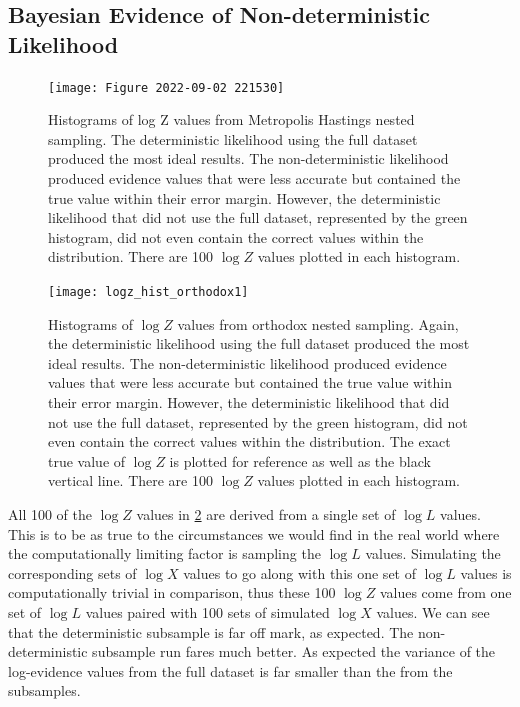 \subsection{Bayesian Evidence of Non-deterministic Likelihood}


\begin{figure} 
\centering    
\texttt{[image: Figure 2022-09-02 221530]}
\caption[Orthodox]{Histograms of log Z values from Metropolis Hastings nested sampling. The deterministic likelihood using the full dataset produced the most ideal results. The non-deterministic likelihood produced evidence values that were less accurate but contained the true value within their error margin. However, the deterministic likelihood that did not use the full dataset, represented by the green histogram, did not even contain the correct values within the distribution. There are 100 $\log Z$ values plotted in each histogram.}
\label{fig:logZ2}
\end{figure}

\begin{figure} 
\centering    
\texttt{[image: logz\_hist\_orthodox1]}
\caption{Histograms of $\log Z$ values from orthodox nested sampling. Again, the deterministic likelihood using the full dataset produced the most ideal results. The non-deterministic likelihood produced evidence values that were less accurate but contained the true value within their error margin. However, the deterministic likelihood that did not use the full dataset, represented by the green histogram, did not even contain the correct values within the distribution. The exact true value of $\log Z$ is plotted for reference as well as the black vertical line. There are 100 $\log Z$ values plotted in each histogram. }
\label{fig:logZ11}
\end{figure}


All 100 of the $\log Z$ values in \cref{fig:logZ11} are derived from a single set of $\log L$ values. This is to be as true to the circumstances we would find in the real world where the computationally limiting factor is sampling the $\log L$ values. Simulating the corresponding sets of $\log X$ values to go along with this one set of $\log L$ values is computationally trivial in comparison, thus these 100 $\log Z$ values come from one set of $\log L$ values paired with 100 sets of simulated $\log X$ values. We can see that the deterministic subsample is far off mark, as expected. The non-deterministic subsample run fares much better. As expected the variance of the log-evidence values from the full dataset is far smaller than the from the subsamples.


